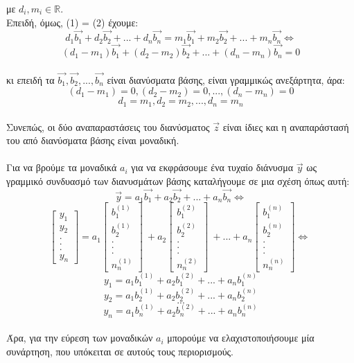\documentclass[12pt]{article}
\newcommand{\R}{\mathbb{R}}
\begin{document}
με $d_i,m_i \in \R$. \\

Επειδή, όμως, (1) = (2) έχουμε: \\

$$ d_1\vec{b_1} + d_2\vec{b_2} + ... + d_n\vec{b_n} = m_1\vec{b_1} + m_2\vec{b_2} + ... + m_n\vec{b_n} \Leftrightarrow$$
$$ (d_1-m_1)\vec{b_1} + (d_2-m_2)\vec{b_2} + ... + (d_n-m_n)\vec{b_n} = 0 $$ \\

κι επειδή τα $\vec{b_1}, \vec{b_2},...,\vec{b_n}$ είναι διανύσματα βάσης, είναι γραμμικώς ανεξάρτητα, άρα: \\

$$ (d_1-m_1) = 0, (d_2-m_2) = 0, ... , (d_n-m_n) = 0 $$
$$ d_1 = m_1, d_2 = m_2, ...,d_n = m_n $$ \\

Συνεπώς, οι δύο αναπαραστάσεις του διανύσματος $\vec{z}$ είναι ίδιες και η αναπαράστασή του από διανύσματα βάσης είναι μοναδική. \\  \\

Για να βρούμε τα μοναδικά $a_i$ για να εκφράσουμε ένα τυχαίο διάνυσμα $\vec{y}$ ως γραμμικό συνδυασμό των διανυσμάτων βάσης καταλήγουμε σε μια σχέση όπως αυτή: \\

$$\vec{y} = a_1\vec{b_1} + a_2\vec{b_2} + ... + a_n\vec{b_n} \Leftrightarrow $$
$$ \begin{bmatrix}
	y_{1}\\
	y_{2}\\
	.\\
	.\\
	.\\
	y_{n}
\end{bmatrix} = a_1
\begin{bmatrix}
b_{1}^{(1)}\\
b_{2}^{(1)}\\
.\\
.\\
.\\
n_{n}^{(1)}
\end{bmatrix} \ + a_2
\begin{bmatrix}
b_{1}^{(2)}\\
b_{2}^{(2)}\\
.\\
.\\
.\\
n_{n}^{(2)}
\end{bmatrix} \ +...+a_n
\begin{bmatrix}
b_{1}^{(n)}\\
b_{2}^{(n)}\\
.\\
.\\
.\\
n_{n}^{(n)}
\end{bmatrix} \Leftrightarrow \ $$
$$ y_1 = a_1b_{1}^{(1)} + a_2b_{1}^{(2)} +...+ a_nb_{1}^{(n)} $$
$$ y_2 = a_1b_{2}^{(1)} + a_2b_{2}^{(2)} +...+ a_nb_{2}^{(n)} $$
$$ ... $$
$$ y_n = a_1b_{n}^{(1)} + a_2b_{n}^{(2)} +...+ a_nb_{n}^{(n)} $$ \\

Άρα, για την εύρεση των μοναδικών $a_i$ μπορούμε να ελαχιστοποιήσουμε μία συνάρτηση, που υπόκειται σε αυτούς τους περιορισμούς. \\

\vspace{2in}
\end{document}

